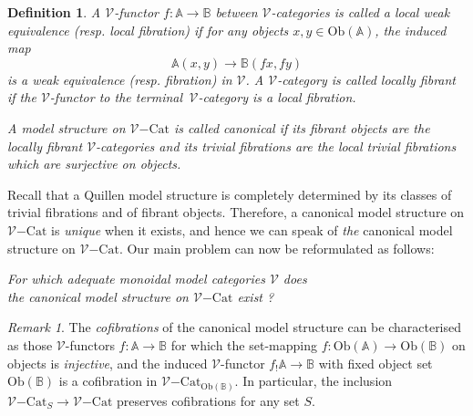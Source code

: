 \documentclass[10pt]{amsart}
\theoremstyle{plain}
\newtheorem{dfn}[subsection]{Definition}
\theoremstyle{remark}
\newtheorem{rmk}[subsection]{Remark}
\def\Vv{\mathcal{V}}
\def\Cat{\mathrm{Cat}}
\def\VCat{\Vv\mathrm{-}\Cat}
\def\AA{\mathbb{A}}
\def\BB{\mathbb{B}}
\def\Ob{\mathrm{Ob}}
\def\rto{\longrightarrow}
\begin{document}
\begin{dfn}A $\Vv$-functor $f:\AA\to\BB$ between $\Vv$-categories is called a \emph{local weak equivalence} (resp. \emph{local fibration}) if for any objects $x,y\in\Ob(\AA)$, the induced map $$\AA(x,y)\rto\BB(fx,fy)$$ is a weak equivalence (resp. fibration) in $\Vv$. A $\Vv$-category is called \emph{locally fibrant} if the $\Vv$-functor to the terminal $\,\Vv$-category is a local fibration.

A model structure on $\VCat$ is called \emph{canonical} if its fibrant objects are the locally fibrant $\Vv$-categories and its trivial fibrations are the local trivial fibrations which are surjective on objects.\end{dfn}

\noindent Recall that a Quillen model structure is completely determined by its classes of trivial fibrations and of fibrant objects. Therefore, a canonical model structure on $\VCat$ is \emph{unique} when it exists, and hence we can speak of \emph{the} canonical model structure on $\VCat$. Our main problem can now be reformulated as follows: \begin{center}\emph{For which adequate monoidal model categories $\Vv$ does\\ the canonical model structure on $\VCat$ exist ?}\end{center}

\begin{rmk}\label{cofibration0}The \emph{cofibrations} of the canonical model structure can be characterised as those $\Vv$-functors $f:\AA\to\BB$ for which the set-mapping $f:\Ob(\AA)\to\Ob(\BB)$ on objects is \emph{injective}, and the induced $\Vv$-functor $f_!\AA\to\BB$ with fixed object set $\Ob(\BB)$ is a cofibration in $\VCat_{\Ob(\BB)}$. In particular, the inclusion $\VCat_S\to\VCat$ preserves cofibrations for any set $S$.\end{rmk}
\end{document}
